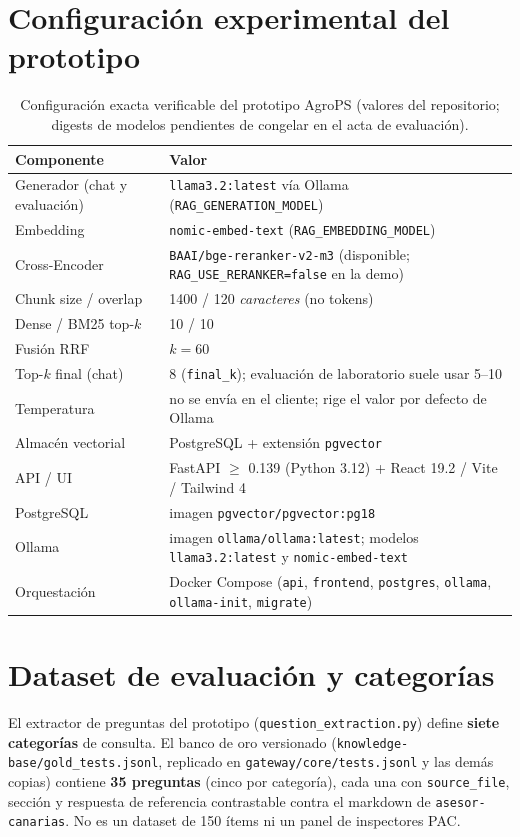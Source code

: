 \section{Configuración experimental del prototipo}
\begin{table}[htbp]
\centering
\caption{Configuración exacta verificable del prototipo AgroPS (valores del repositorio; digests de modelos pendientes de congelar en el acta de evaluación).}
\label{tab:config}
\begin{tabular}{p{4.2cm}p{9.5cm}}
\toprule
\textbf{Componente} & \textbf{Valor} \\
\midrule
Generador (chat y evaluación) & \texttt{llama3.2:latest} vía Ollama (\texttt{RAG\_GENERATION\_MODEL}) \\
Embedding & \texttt{nomic-embed-text} (\texttt{RAG\_EMBEDDING\_MODEL}) \\
Cross-Encoder & \texttt{BAAI/bge-reranker-v2-m3} (disponible; \texttt{RAG\_USE\_RERANKER=false} en la demo) \\
Chunk size / overlap & 1400 / 120 \emph{caracteres} (no tokens) \\
Dense / BM25 top-$k$ & 10 / 10 \\
Fusión RRF & $k=60$ \\
Top-$k$ final (chat) & 8 (\texttt{final\_k}); evaluación de laboratorio suele usar 5--10 \\
Temperatura & no se envía en el cliente; rige el valor por defecto de Ollama \\
Almacén vectorial & PostgreSQL + extensión \texttt{pgvector} \\
API / UI & FastAPI $\geq$ 0.139 (Python 3.12) + React 19.2 / Vite / Tailwind 4 \\
PostgreSQL & imagen \texttt{pgvector/pgvector:pg18} \\
Ollama & imagen \texttt{ollama/ollama:latest}; modelos \texttt{llama3.2:latest} y \texttt{nomic-embed-text} \\
Orquestación & Docker Compose (\texttt{api}, \texttt{frontend}, \texttt{postgres}, \texttt{ollama}, \texttt{ollama-init}, \texttt{migrate}) \\
\bottomrule
\end{tabular}
\end{table}


\section{Dataset de evaluación y categorías}
El extractor de preguntas del prototipo (\texttt{question\_extraction.py}) define \textbf{siete categorías} de consulta. El banco de oro versionado (\texttt{knowledge-base/gold\_tests.jsonl}, replicado en \texttt{gateway/core/tests.jsonl} y las demás copias) contiene \textbf{35 preguntas} (cinco por categoría), cada una con \texttt{source\_file}, sección y respuesta de referencia contrastable contra el markdown de \texttt{asesor-canarias}. No es un dataset de 150 ítems ni un panel de inspectores PAC.

